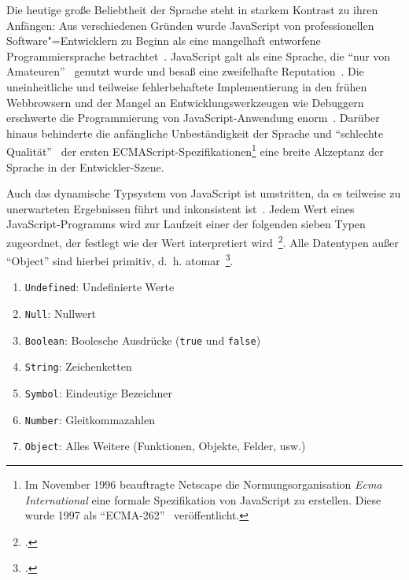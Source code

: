 Die heutige große Beliebtheit der Sprache steht in starkem Kontrast zu ihren Anfängen: Aus verschiedenen Gründen wurde JavaScript von professionellen Software"=Entwicklern zu Beginn als eine mangelhaft entworfene Programmiersprache betrachtet~\autocite{CROCKFORD:JS_POPULAR}. JavaScript galt als eine Sprache, die \enquote{nur von Amateuren}~\autocite{CROCKFORD:JS_MISUNDERSTOOD} genutzt wurde und besaß eine zweifelhafte Reputation~\autocite{THIEMANN:2005,THOMAS:2007}. Die uneinheitliche und teilweise fehlerbehaftete Implementierung in den frühen Webbrowsern und der Mangel an Entwicklungswerkzeugen wie Debuggern erschwerte die Programmierung von JavaScript-Anwendung enorm~\autocite{OREILLY:JS_HOW_DID_WE_GET_THERE}. Darüber hinaus behinderte die anfängliche Unbeständigkeit der Sprache und \enquote{schlechte Qualität}~\autocite{CROCKFORD:JS_MISUNDERSTOOD} der ersten ECMAScript-Spezifikationen\footnote{Im November 1996 beauftragte Netscape die Normungsorganisation \textit{Ecma International} eine formale Spezifikation von JavaScript zu erstellen. Diese wurde 1997 als \enquote{ECMA-262}~\autocite{ECMASCRIPT:1997} veröffentlicht.} eine breite Akzeptanz der Sprache in der Entwickler-Szene.

Auch das dynamische Typsystem von JavaScript ist umstritten, da es teilweise zu unerwarteten Ergebnissen führt und inkonsistent ist~\autocite{PRADEL:2015,RICHARDS:2010}. Jedem Wert eines JavaScript-Programms wird zur Laufzeit einer der folgenden sieben Typen zugeordnet, der festlegt wie der Wert interpretiert wird~\footcite[Abschn.~6.1]{ECMASCRIPT:2019}. Alle Datentypen außer \enquote{Object} sind hierbei primitiv, d.~h. atomar~\footcite[Abschn. 4.3.2]{ECMASCRIPT:2019}.

\begin{enumerate}
  \item \texttt{Undefined}: Undefinierte Werte
  \item \texttt{Null}: Nullwert
  \item \texttt{Boolean}: Boolesche Ausdrücke (\texttt{true} und \texttt{false})
  \item \texttt{String}: Zeichenketten
  \item \texttt{Symbol}: Eindeutige Bezeichner
  \item \texttt{Number}: Gleitkommazahlen
  \item \texttt{Object}: Alles Weitere (Funktionen, Objekte, Felder, usw.)
\end{enumerate}


